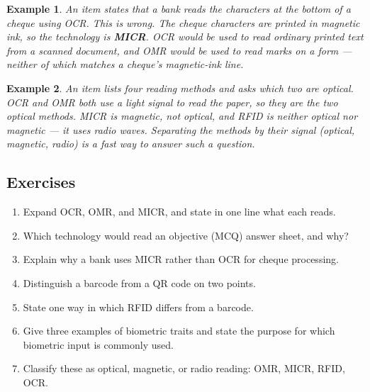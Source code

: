 \documentclass[11pt]{article}
\newtheorem{example}{Example}[section]
\begin{document}
\begin{example}
An item states that a bank reads the characters at the bottom of a cheque
using OCR. This is wrong. The cheque characters are printed in magnetic ink,
so the technology is \textbf{MICR}. OCR would be used to read ordinary
\emph{printed text} from a scanned document, and OMR would be used to read
\emph{marks} on a form --- neither of which matches a cheque's magnetic-ink
line.
\end{example}

\begin{example}
An item lists four reading methods and asks which two are \emph{optical}.
OCR and OMR both use a light signal to read the paper, so they are the two
optical methods. MICR is \emph{magnetic}, not optical, and RFID is neither
optical nor magnetic --- it uses radio waves. Separating the methods by their
signal (optical, magnetic, radio) is a fast way to answer such a question.
\end{example}

\subsection*{Exercises}
\begin{enumerate}[label=\arabic*.]
  \item Expand OCR, OMR, and MICR, and state in one line what each reads.
  \item Which technology would read an objective (MCQ) answer sheet, and
    why?
  \item Explain why a bank uses MICR rather than OCR for cheque processing.
  \item Distinguish a barcode from a QR code on two points.
  \item State one way in which RFID differs from a barcode.
  \item Give three examples of biometric traits and state the purpose for
    which biometric input is commonly used.
  \item Classify these as optical, magnetic, or radio reading: OMR, MICR,
    RFID, OCR.
\end{enumerate}
\end{document}
